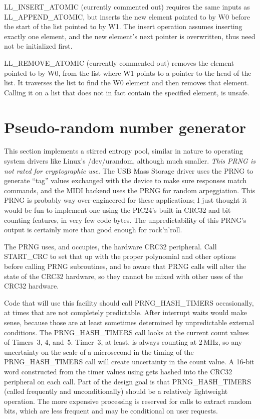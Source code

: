 LL\_INSERT\_ATOMIC (currently commented out) requires the same inputs as
LL\_APPEND\_ATOMIC, but inserts the new element pointed to by W0 before the
start of the list pointed to by W1.  The insert operation assumes inserting
exactly one element, and the new element's next pointer is overwritten, thus
need not be initialized first.

LL\_REMOVE\_ATOMIC (currently commented out) removes the element pointed to
by W0, from the list where W1 points to a pointer to the head of the list. 
It traverses the list to find the W0 element and then removes that element. 
Calling it on a list that does not in fact contain the specified element,
is unsafe.

\section{Pseudo-random number generator}

This section implements a stirred entropy pool, similar in nature to
operating system drivers like Linux's /dev/urandom, although much smaller. 
\emph{This PRNG is not rated for cryptographic use.} The USB Mass Storage
driver uses the PRNG to generate ``tag'' values exchanged with the device to
make sure responses match commands, and the MIDI backend uses the PRNG for
random arpeggiation.  This PRNG is probably way over-engineered for these
applications; I just thought it would be fun to implement one using the
PIC24's built-in CRC32 and bit-counting features, in very few code
bytes.  The unpredictability of this PRNG's output is certainly more than
good enough for rock'n'roll.

The PRNG uses, and occupies, the hardware CRC32 peripheral.  Call START\_CRC
to set that up with the proper polynomial and other options before calling
PRNG subroutines, and be aware that PRNG calls will alter the state of the
CRC32 hardware, so they cannot be mixed with other uses of the CRC32
hardware.

Code that will use this facility should call PRNG\_HASH\_TIMERS
occasionally, at times that are not completely predictable.  After interrupt
waits would make sense, because those are at least sometimes determined by
unpredictable external conditions.  The PRNG\_HASH\_TIMERS call looks at the
current count values of Timers~3, 4, and~5.  Timer~3, at least, is always
counting at 2\,MHz, so any uncertainty on the scale of a microsecond in the
timing of the PRNG\_HASH\_TIMERS call will create uncertainty in the count
value.  A 16-bit word constructed from the timer values using 
gets hashed into the CRC32 peripheral on each call.  Part of the design goal
is that PRNG\_HASH\_TIMERS (called frequently and unconditionally) should be
a relatively lightweight operation.  The more expensive processing is
reserved for calls to extract random bits, which are less frequent and may
be conditional on user requests.

